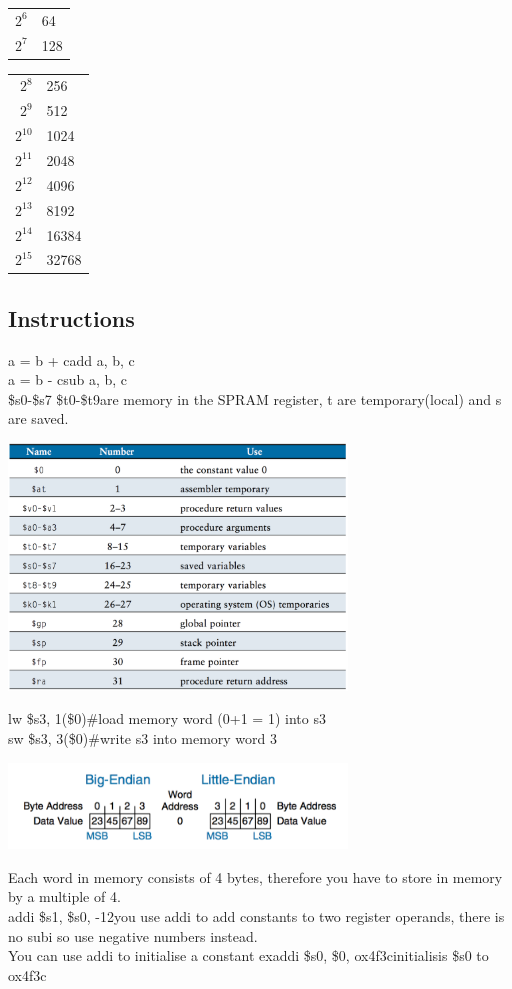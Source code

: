 \begin{multicols}{2}
{\begin{tabular}{r @{ = } l}
			$2^{6}$ & 64 \\
			$2^{7}$ & 128
		\end{tabular} \quad
		\begin{tabular}{r @{ = } l}
			$2^{8}$ & 256 \\
			$2^{9}$ & 512 \\
			$2^{10}$ & 1024 \\
			$2^{11}$ & 2048 \\
			$2^{12}$ & 4096 \\
			$2^{13}$ & 8192 \\
			$2^{14}$ & 16384 \\
			$2^{15}$ & 32768
		\end{tabular}
		}
		
	\end{multicols}
	
	\subsection{Instructions}
		a = b + c\tab	add a, b, c\\
		a = b - c\tab	sub a, b, c\\
		\$s0-\$s7 \tab \$t0-\$t9\tab are memory in the SPRAM register, t are temporary(local) and s are saved.
		\begin{center}
				\includegraphics[width = 9cm]{images/reg}
		\end{center}
		lw \$s3, 1(\$0)\tab \#load memory word (0+1 = 1) into s3\\
		sw \$s3, 3(\$0)\tab \#write s3 into memory word 3\\
		\begin{center}
				\includegraphics[width = 9cm]{images/big}
		\end{center}
		Each word in memory consists of 4 bytes, therefore you have to store in memory by a multiple of 4.\\
		addi \$s1, \$s0, -12\tab you use addi to add constants to two  register operands, there is no subi so use negative numbers instead.\\
		You can use addi to initialise a constant ex\tab addi \$s0, \$0, ox4f3c\tab initialisis \$s0 to ox4f3c
